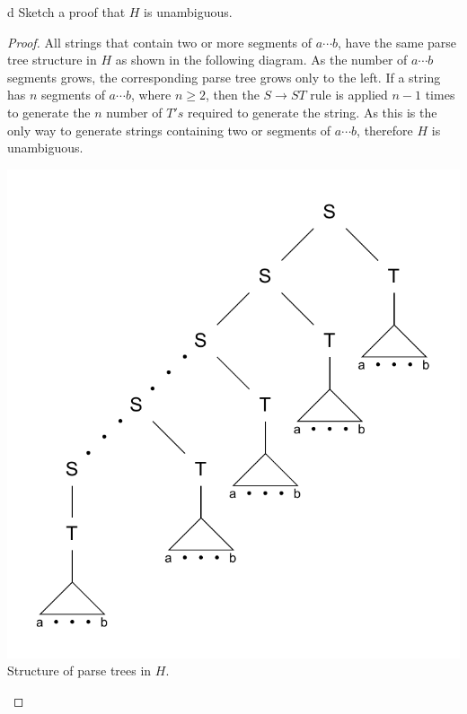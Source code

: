 \documentclass[11pt]{article}
\begin{document}
\begin{problem}[Part]{d}
Sketch a proof that $H$ is unambiguous.
\end{problem}

\begin{proof}
All strings that contain two or more segments of $a \cdots b$, have the same parse tree structure in $H$ as shown in the following diagram. As the number of $a \cdots b$ segments grows, the corresponding parse tree grows only to the left. If a string has $n$ segments of $a \cdots b$, where $n \geq 2$, then the $S \rightarrow ST$ rule is applied $n-1$ times to generate the $n$ number of $T's$ required to generate the string. As this is the only way to generate strings containing two or segments of $a \cdots b$, therefore $H$ is unambiguous.
\begin{center}
\includegraphics[scale=0.8]{Figures/Problem2.46b.pdf} \\
Structure of parse trees in $H$.
\end{center}
\end{proof}
\end{document}

